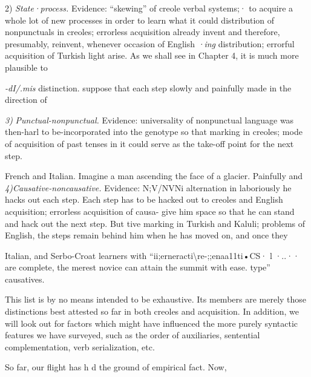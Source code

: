 2) \textit{State}\textit{·}\textit{process.} Evidence: ``skewing'' of creole verbal systems;· to acquire a whole lot of new processes in order to learn what it could distribution of nonpunctuals in creoles; errorless acquisition already invent and therefore, presumably, reinvent, whenever occasion of English \textit{·}\textit{ing }distribution; errorful acquisition of Turkish l{\textquotedbl}ight arise. As we shall see in Chapter 4, it is much more plausible to

\textit{{}-dI/.mis} distinction. suppose that each step slowly and painfully made in the direction of

\textit{3}\textit{)} \textit{Punctual-nonpunctual. }Evidence: universality of nonpunctual language was then-harl to be-incorporated into the genotype so that marking in creoles; mode of acquisition of past tenses in it could serve as the take-off point for the next step.

French and Italian. Imagine a man ascending the face of a glacier. Painfully and \textit{4)Causative-noncausative. }Evidence: N;V/NVNi alternation in laboriously he hacks out each step. Each step has to be hacked out to creoles and English acquisition; errorless acquisition of causa- give him space so that he can stand and hack out the next step. But tive marking in Turkish and Kaluli; problems of English, the steps remain behind him when he has moved on, and once they

Italian, and Serbo-Croat learners with ``ii;erneracti{\textbackslash}re-;;enaa11ti•CS· l ·..·· are complete, the merest novice can attain the summit with ease. type'' causatives.

This list is by no means intended to be exhaustive. Its members are merely those distinctions best attested so far in both creoles and acquisition. In addition, we will look out for factors which might have influenced the more purely syntactic features we have surveyed, such as the order of auxiliaries, sentential complementation, verb serialization, etc.

So far, our flight has h d the ground of empirical fact. Now,

